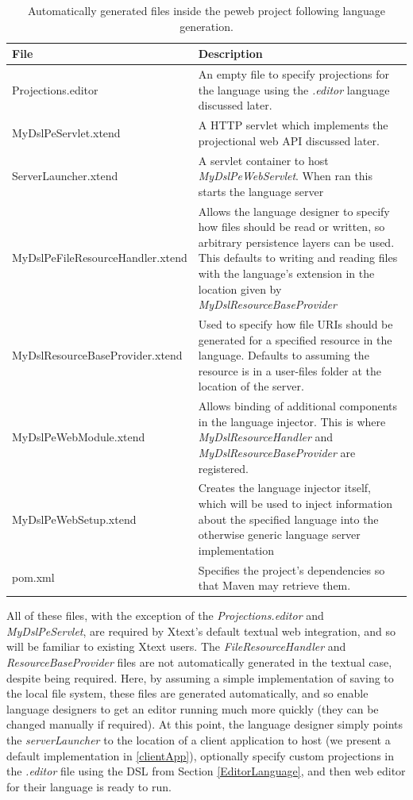 \documentclass{article}
\begin{document}
\begin{table}[h!]
\centering
\begin{tabular}{| m{7cm} | m{8cm} |}
\hline
File & Description \\
\hline \hline
Projections.editor & An empty file to specify projections for the language using the \emph{.editor} language discussed later.\\
\hline
MyDslPeServlet.xtend & A HTTP servlet which implements the projectional web API discussed later.\\
\hline
ServerLauncher.xtend & A servlet container to host \emph{MyDslPeWebServlet}. When ran this starts the language server \\
\hline
MyDslPeFileResourceHandler.xtend & Allows the language designer to specify how files should be read or written, so arbitrary persistence layers can be used. This defaults to writing and reading files with the language's extension in the location given by  \emph{MyDslResourceBaseProvider} \\
\hline
MyDslResourceBaseProvider.xtend & Used to specify how file URIs should be generated for a specified resource in the language. Defaults to assuming the resource is in a user-files folder at the location of the server.\\
\hline
MyDslPeWebModule.xtend & Allows binding of additional components in the language injector. This is where \emph{MyDslResourceHandler} and \emph{MyDslResourceBaseProvider} are registered.\\
\hline
MyDslPeWebSetup.xtend & Creates the language injector itself, which will be used to inject information about the specified language into the otherwise generic language server implementation\\
\hline
pom.xml & Specifies the project's dependencies so that Maven may retrieve them.\\
\hline
\end{tabular}
\caption{Automatically generated files inside the peweb project following language generation.}
\label{Tab:generatedFiles}
\end{table}All of these files, with the exception of the \emph{Projections.editor} and \emph{MyDslPeServlet}, are required by Xtext's default textual web integration, and so will be familiar to existing Xtext users. The \emph{FileResourceHandler} and \emph{ResourceBaseProvider} files are not automatically generated in the textual case, despite being required. Here, by assuming a simple implementation of saving to the local file system, these files are generated automatically, and so enable language designers to get an editor running much more quickly (they can be changed manually if required). At this point, the language designer simply points the \emph{serverLauncher} to the location of a client application to host (we present a default implementation in \ref{clientApp}), optionally specify custom projections in the \emph{.editor} file using the DSL from Section \ref{EditorLanguage}, and then web editor for their language is ready to run.
\end{document}
